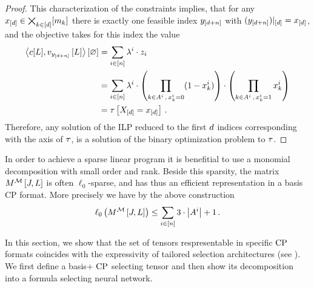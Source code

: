 \begin{proof}
    This characterization of the constraints implies, that for any $x_{[d]}\in\bigtimes_{k\in[d]}[m_{k}]$ there is exactly one feasible index $y_{[d+n]}$ with ${(y_{[d+n]})}|_{[d]}=x_{[d]}$, and the objective takes for this index the value
    \begin{align*}
        \left\langle c[L], v_{y_{[d+n]}}\left[L\right]\right\rangle \left[ \varnothing \right]
        &= \sum_{i\in[n]} \lambda^{i} \cdot z_{i} \\
        &= \sum_{i\in[n]} \lambda^{i} \cdot \left( \prod_{k\in A^{i} \, , \,  x_{k}^i = 0} (1 - x_{k}^i) \right)
        \cdot \left( \prod_{k\in A^{i} \, , \,  x_{k}^i = 1}  x_{k}^i \right)  \\
        & = \tau\left[X_{[d]}=x_{[d]}\right] \, .
    \end{align*}
    Therefore, any solution of the ILP reduced to the first $d$ indices corresponding with the axis of $\tau$, is a solution of the binary optimization problem to $\tau$.
\end{proof}


In order to achieve a sparse linear program it is benefitial to use a monomial decomposition with small order and rank.
Beside this sparsity, the matrix $M^{\mathcal{M}}\left[J,L\right]$ is often $\ell_0$-sparse, and has thus an efficient representation in a basis CP format.
More precisely we have by the above construction
\begin{align*}
    \ell_0\left(M^{\mathcal{M}}\left[J,L\right]\right) \leq \sum_{i\in[n]} 3 \cdot \left|A^{i}\right| +1 \, .
\end{align*}



In this section, we show that the set of tensors respresentable in specific $\mathrm{CP}$ formats coincides with the expressivity of tailored selection architectures (see ).
We first define a basis+ $\mathrm{CP}$ selecting tensor and then show its decomposition into a formula selecting neural network.

